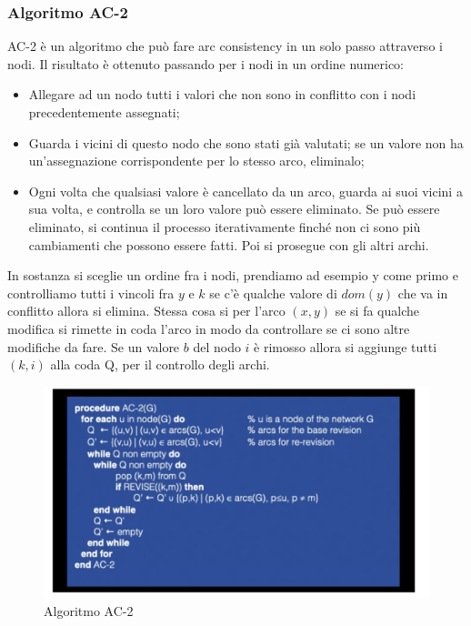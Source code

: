 \subsubsection{Algoritmo AC-2}
AC-2 è un algoritmo che può fare arc consistency in un solo passo attraverso i
nodi. Il risultato è ottenuto passando per i nodi in un ordine numerico:
\begin{itemize}
    \item Allegare ad un nodo tutti i valori che non sono in conflitto con i
          nodi precedentemente assegnati;
    \item Guarda i vicini di questo nodo che sono stati già valutati; se un
          valore non ha un'assegnazione corrispondente per lo stesso arco, eliminalo;
    \item Ogni volta che qualsiasi valore è cancellato da un arco, guarda ai
          suoi vicini a sua volta, e controlla se un loro valore può essere eliminato.
          Se può essere eliminato, si continua il processo iterativamente finché non
          ci sono più cambiamenti che possono essere fatti. Poi si prosegue con gli
          altri archi.
\end{itemize}
In sostanza si sceglie un ordine fra i nodi, prendiamo ad esempio y come primo e
controlliamo tutti i vincoli fra $y$ e $k$ se c'è qualche valore di $dom(y)$ che va in
conflitto allora si elimina. Stessa cosa si per l'arco $(x,y)$ se si fa qualche
modifica si rimette in coda l'arco in modo da controllare se ci sono altre
modifiche da fare. Se un valore $b$ del nodo $i$ è rimosso allora si aggiunge tutti
$(k,i)$ alla coda Q, per il controllo degli archi.

\begin{figure}[H]
    \centering
    \includegraphics[width=13cm, keepaspectratio]{img/Cap3/ac-2.png}
    \caption{Algoritmo AC-2}
\end{figure}

